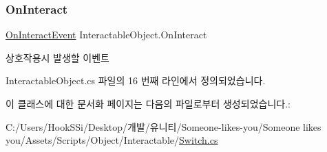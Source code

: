 \subsubsection{\texorpdfstring{OnInteract}{OnInteract}}
{\footnotesize\ttfamily \mbox{\hyperlink{class_interactable_object_a70a579e4b09d53e6cb77b5222189d5eb}{On\+Interact\+Event}} Interactable\+Object.\+On\+Interact\hspace{0.3cm}{\ttfamily [inherited]}}



상호작용시 발생할 이벤트 



Interactable\+Object.\+cs 파일의 16 번째 라인에서 정의되었습니다.



이 클래스에 대한 문서화 페이지는 다음의 파일로부터 생성되었습니다.\+:\begin{DoxyCompactItemize}
\item 
C\+:/\+Users/\+Hook\+S\+Si/\+Desktop/개발/유니티/\+Someone-\/likes-\/you/\+Someone likes you/\+Assets/\+Scripts/\+Object/\+Interactable/\mbox{\hyperlink{_switch_8cs}{Switch.\+cs}}\end{DoxyCompactItemize}
